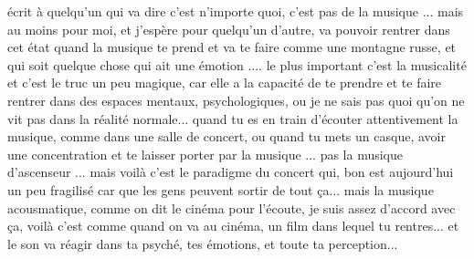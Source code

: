 écrit à quelqu'un qui va dire c'est n'importe quoi, c'est pas de la musique ... mais au moins pour moi, et j'espère pour quelqu'un d'autre, va pouvoir rentrer dans cet état quand la musique te prend et va te faire comme une montagne russe, et qui soit quelque chose qui ait une émotion .... le plus important c'est la musicalité et c'est le truc un peu magique, car elle a la capacité de te prendre et te faire rentrer dans des espaces mentaux, psychologiques, ou je ne sais pas quoi qu'on ne vit pas dans la réalité normale... quand tu es en train d'écouter attentivement la musique, comme dans une salle de concert, ou quand tu mets un casque, avoir une concentration et te laisser porter par la musique ... pas la musique d'ascenseur ... mais voilà c'est le paradigme du concert qui, bon est aujourd'hui un peu fragilisé car que les gens peuvent sortir de tout ça... mais la musique acousmatique, comme on dit le cinéma pour l'écoute, je suis assez d'accord avec ça, voilà c'est comme quand on va au cinéma, un film dans lequel tu rentres... et le son va réagir dans ta psyché, tes émotions, et toute ta perception...  






